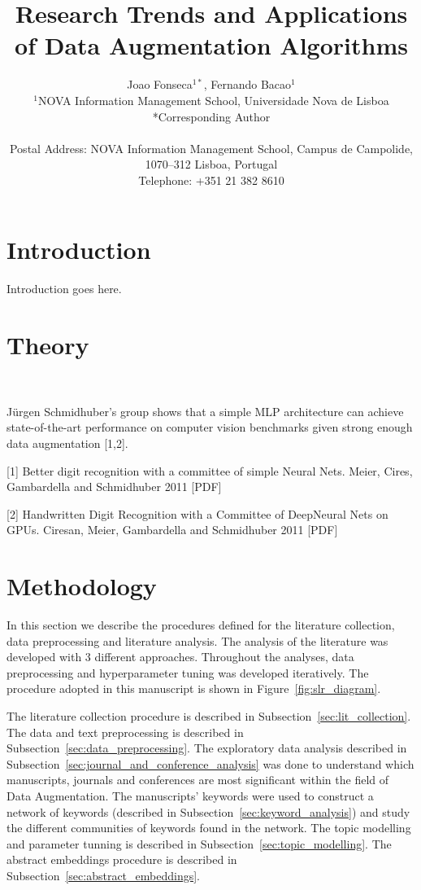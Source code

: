 \documentclass[parskip=full]{scrartcl}
\date{}
\title{%
    Research Trends and Applications of Data Augmentation Algorithms
}
\author{%
	Joao Fonseca\(^{1*}\), Fernando Bacao\(^{1}\)
	\\
	\small{\(^{1}\)NOVA Information Management School, Universidade Nova de Lisboa}
	\\
	\small{*Corresponding Author}
	\\
	\\
	\small{Postal Address: NOVA Information Management School, Campus de
    Campolide, 1070--312 Lisboa, Portugal}
	\\
	\small{Telephone: +351 21 382 8610}
}
\begin{document}
\maketitle

\section{Introduction}

Introduction goes here.

\section{Theory}~\label{sec:theory}

Jürgen Schmidhuber's group shows that a simple MLP architecture can achieve
state-of-the-art performance on computer vision benchmarks given strong enough
data augmentation [1,2].

[1] Better digit recognition with a committee of simple Neural Nets. Meier,
Cires, Gambardella and Schmidhuber 2011 [PDF]

[2] Handwritten Digit Recognition with a Committee of DeepNeural Nets on GPUs.
Ciresan, Meier, Gambardella and Schmidhuber 2011 [PDF]

\section{Methodology}

In this section we describe the procedures defined for the literature
collection, data preprocessing and literature analysis. The analysis of the
literature was developed with 3 different approaches. Throughout the
analyses, data preprocessing and hyperparameter tuning was developed
iteratively. The procedure adopted in this manuscript is shown in
Figure~\ref{fig:slr_diagram}.

The literature collection procedure is described in
Subsection~\ref{sec:lit_collection}. The data and text preprocessing is
described in Subsection~\ref{sec:data_preprocessing}. The exploratory data
analysis described in Subsection~\ref{sec:journal_and_conference_analysis} was
done to understand which manuscripts, journals and conferences are most
significant within the field of Data Augmentation. The manuscripts' keywords
were used to construct a network of keywords (described in
Subsection~\ref{sec:keyword_analysis}) and study the different communities of
keywords found in the network. The topic modelling and parameter tunning is described in
Subsection~\ref{sec:topic_modelling}. The abstract embeddings procedure is
described in Subsection~\ref{sec:abstract_embeddings}.
\end{document}
